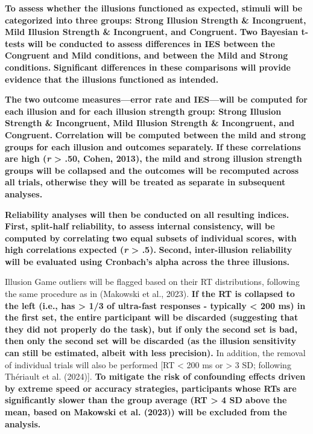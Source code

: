 \documentclass[
  man,
  floatsintext,
  longtable,
  nolmodern,
  notxfonts,
  notimes,
  colorlinks=true,linkcolor=blue,citecolor=blue,urlcolor=blue]{apa7}
\begin{document}
\textbf{To assess whether the illusions functioned as expected, stimuli
will be categorized into three groups: Strong Illusion Strength \&
Incongruent, Mild Illusion Strength \& Incongruent, and Congruent.}
\textbf{Two Bayesian t-tests will be conducted to assess differences in
IES between the Congruent and Mild conditions, and between the Mild and
Strong conditions.} \textbf{Significant differences in these comparisons
will provide evidence that the illusions functioned as intended.}

\textbf{The two outcome measures---error rate and IES---will be computed
for each illusion and for each illusion strength group: Strong Illusion
Strength \& Incongruent, Mild Illusion Strength \& Incongruent, and
Congruent.} \textbf{Correlation will be computed between the mild and
strong groups for each illusion and outcomes separately.} \textbf{If
these correlations are high (\emph{r} \textgreater{} .50, Cohen, 2013),
the mild and strong illusion strength groups will be collapsed and the
outcomes will be recomputed across all trials, otherwise they will be
treated as separate in subsequent analyses.}

\textbf{Reliability analyses will then be conducted on all resulting
indices.} \textbf{First, split-half reliability, to assess internal
consistency, will be computed by correlating two equal subsets of
individual scores, with high correlations expected (\emph{r}
\textgreater{} .5).} \textbf{Second, inter-illusion reliability will be
evaluated using Cronbach's alpha across the three illusions.}

Illusion Game outliers will be flagged based on their RT distributions,
following the same procedure as in (Makowski et al., 2023). \textbf{If
the RT is collapsed to the left (i.e., has \textgreater{} 1/3 of
ultra-fast responses - typically \textless{} 200 ms) in the first set,
the entire participant will be discarded (suggesting that they did not
properly do the task), but if only the second set is bad, then only the
second set will be discarded (as the illusion sensitivity can still be
estimated, albeit with less precision).} In addition, the removal of
individual trials will also be performed {[}RT \textless{} 200 ms or
\textgreater{} 3 SD; following Thériault et al. (2024){]}. \textbf{To
mitigate the risk of confounding effects driven by extreme speed or
accuracy strategies, participants whose RTs are significantly slower
than the group average (RT \textgreater{} 4 SD above the mean, based on
Makowski et al. (2023)) will be excluded from the analysis.}
\end{document}
